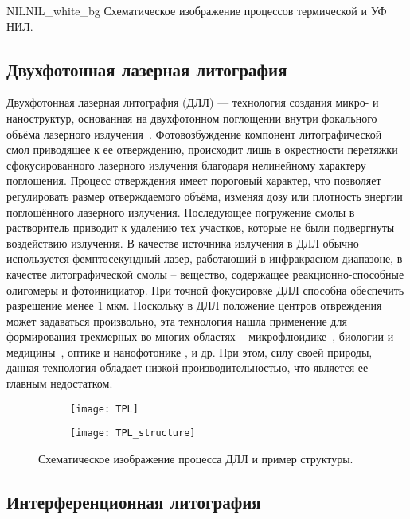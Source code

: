 \begin{fig}{NIL}{NIL_white_bg}
	Схематическое изображение процессов термической и УФ НИЛ.
\end{fig}

\subsection{Двухфотонная лазерная литография}

Двухфотонная лазерная литография (ДЛЛ) — технология создания микро- и наноструктур, основанная на двухфотонном поглощении внутри фокального объёма лазерного излучения~\cite{Hohmann2015, Kawata2001}. Фотовозбуждение компонент литографической смол приводящее к ее отверждению, происходит лишь в окрестности перетяжки сфокусированного лазерного излучения благодаря нелинейному характеру поглощения. Процесс отверждения имеет пороговый характер, что позволяет регулировать размер отверждаемого объёма, изменяя дозу или плотность энергии поглощённого лазерного излучения. Последующее погружение смолы в растворитель приводит к удалению тех участков, которые не были подвергнуты воздействию излучения. В качестве источника излучения в ДЛЛ обычно используется фемптосекундный лазер, работающий в инфракрасном диапазоне, в качестве литографической смолы -- вещество, содержащее реакционно-способные олигомеры и фотоинициатор. При точной фокусировке ДЛЛ способна обеспечить разрешение менее 1 мкм. Поскольку в ДЛЛ положение центров отвреждения может задаваться произвольно, эта технология нашла применение для формирования трехмерных во многих областях -- микрофлюидике~\cite{TPL_microfluidics_1, TPL_microfluidics_2}, биологии и \break медицины~\cite{TPL_biology_1, TPL_biology_2}, оптике и нанофотонике \cite{TPL_optics, TPL_nanophotonics}, и др. При этом, силу своей природы, данная технология обладает низкой производительностью, что является ее главным недостатком.

\begin{figure}
	\centering
	\begin{subfigure}{.5\textwidth}
		\centering
		\texttt{[image: TPL]}
	\end{subfigure}%
	\begin{subfigure}{.5\textwidth}
		\centering
		\texttt{[image: TPL\_structure]}
	\end{subfigure}
	\caption{Схематическое изображение процесса ДЛЛ и пример структуры.}
\end{figure}


\subsection{Интерференционная литография}

